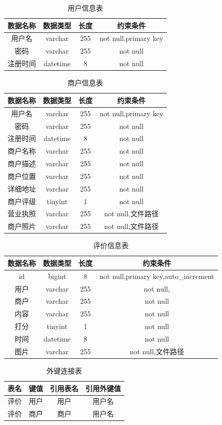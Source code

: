 \documentclass[]{article}
\begin{document}
	\begin{table}[!hbp]
		\centering
		\caption{用户信息表}\label{用户}
		\begin{tabular}{|c|c|c|c|}
			\hline
			数据名称&数据类型&长度&约束条件\\
			\hline
			用户名&varchar&255&not null,primary key\\
			密码&varchar&255&not null\\
			注册时间&datetime&8&not null\\
			\hline
		\end{tabular}
	\end{table}
	\begin{table}[!hbp]
		\centering
		\caption{商户信息表}\label{商户}
		\begin{tabular}{|c|c|c|c|}
			\hline
			数据名称&数据类型&长度&约束条件\\
			\hline
			用户名&varchar&255&not null,primary key\\
			密码&varchar&255&not null\\
			注册时间&datetime&8&not null\\
			商户名称&varchar&255&not null\\
			商户描述&varchar&255&not null\\
			商户位置&varchar&255&not null\\
			详细地址&varchar&255&not null\\
			商户评级&tinyint&1&not null\\
			营业执照&varchar&255&not null,文件路径\\
			商户照片&varchar&255&not null,文件路径\\
			\hline
		\end{tabular}
	\end{table}
	\begin{table}[!hbp]
		\centering
		\caption{评价信息表}\label{评价}
		\begin{tabular}{|c|c|c|c|}
			\hline
			数据名称&数据类型&长度&约束条件\\
			\hline
			id&bigint&8&not null,primary key,auto\_increment\\
			用户&varchar&255&not null,\\
			商户&varchar&255&not null\\
			内容&varchar&255&not null\\
			打分&tinyint&1&not null\\
			时间&datetime&8&not null\\
			图片&varchar&255&not null,文件路径\\
			\hline
		\end{tabular}
	\end{table}
	\begin{table}[!hbp]
		\centering
		\caption{外键连接表}\label{外键}
		\begin{tabular}{|c|c|c|c|}
			\hline
			表名&键值&引用表名&引用外键值\\
			\hline
			评价&用户&用户&用户名\\
			评价&商户&商户&用户名\\
			\hline
		\end{tabular}
	\end{table}
	
\end{document}
